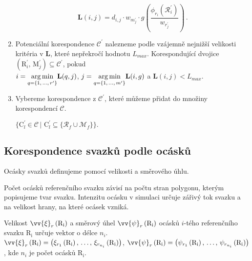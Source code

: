 \begin{enumerate}
\begin{equation}
\mathbf{L}(i,j) = d_{i,j}\cdot w_{m^\prime_{j}} \cdot g \left(\dfrac{\phi_{r_i}(\mathcal{R}^\prime_i)}{w_{r^\prime_{j}}} \right)\,. 
\label{eq: L_tok}
\end{equation}


\item Potenciální korespondence $\mathcal{C}^\prime$ nalezneme podle vzájemně nejnižší velikosti  kritéria v $\mathbf{L}$, které nepřekročí hodnotu $L_{max}$. Korespondující dvojice $\left(\mathrm{R}^\prime_i,\,\mathrm{M}^\prime_j \right) \subseteq \mathcal{C}^\prime$, pokud\\ $i = \underset{{q = \lbrace1,\,\dots,\,r^\prime\rbrace}}{\operatorname*{arg\,min}}\mathbf{L}(q,j)$, $j = \underset{{q = \lbrace1,\,\dots,\,m^\prime\rbrace}}{\operatorname*{arg\,min}}\mathbf{L}(i,g)$ a  $\mathbf{L}(i,j) < L_{max}$. 

\item Vybereme korespondence z $\mathcal{C}^\prime$, které můžeme přidat do množiny korespondencí $\mathcal{C}$. 

 $\lbrace \mathrm{C}^\prime_l \in \mathcal{C}\,|\,\, \mathrm{C}^\prime_l \subseteq \lbrace\mathcal{R}_f \cup \mathcal{M}_f\rbrace \rbrace$.

 
\end{enumerate}

\newpage
\subsection{Korespondence svazků podle ocásků}
\label{sec: korespondence_ocasky}
		
	Ocásky svazků definujeme pomocí velikosti a směrového úhlu.
	
	Počet ocásků referenčního svazku závisí na počtu stran polygonu, kterým popisujeme tvar svazku. Intenzitu ocásku v simulaci určuje zářivý tok svazku a na velikost hrany, na které ocásek vzniká. 
	
	Velikost $\vv{\xi}_{r}\left(\mathrm{R_i}\right)$ a směrový úhel $\vv{\psi}_{r}\left(\mathrm{R_i}\right)$ ocásků  $i$-tého referenčního svazku $\mathrm{R_i}$ určuje vektor o délce $n_i$.\\
	 $\vv{\xi}_{r}\left(\mathrm{R_i}\right) = \left(\xi_{r_1}\left(\mathrm{R_i}\right),\,\dots,\,\xi_{r_{n_i}}\left(\mathrm{R_i}\right)\right)$, $\vv{\psi}_{r}\left(\mathrm{R_i}\right) = \left(\psi_{r_1}\left(\mathrm{R_i}\right),\,\dots,\,\psi_{r_{n_i}}\left(\mathrm{R_i}\right)\right)$, kde $n_i$ je počet ocásků $\mathrm{R_i}$. 
	
